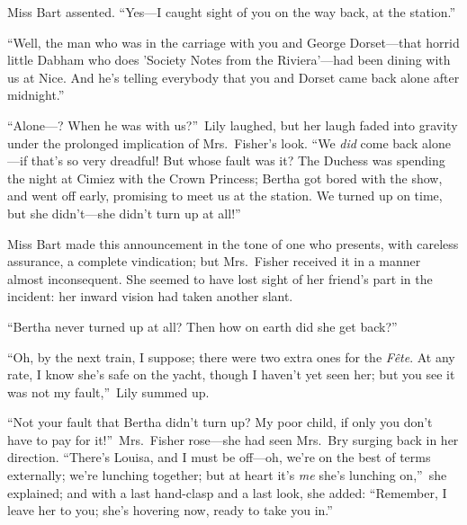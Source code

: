 \documentclass[12pt,a4paper]{book}
\begin{document}
Miss Bart assented. ``Yes---I caught sight of you on the way back,
at the station.''





``Well, the man who was in the carriage with you and George
Dorset---that horrid little Dabham who does 'Society Notes from
the Riviera'---had been dining with us at Nice. And he's telling
everybody that you and Dorset came back alone after midnight.''





``Alone---? When he was with us?''\ Lily laughed, but her laugh faded
into gravity under the prolonged implication of Mrs.\ Fisher's
look. ``We \textit{did} come back alone---if that's so very dreadful! But
whose fault was it? The Duchess was spending the night at Cimiez
with the Crown Princess; Bertha got bored with the show, and went
off early, promising to meet us at the station. We turned up on
time, but she didn't---she didn't turn up at all!''





Miss Bart made this announcement in the tone of one who presents,
with careless assurance, a complete vindication; but Mrs.\ Fisher
received it in a manner almost inconsequent. She seemed to have
lost sight of her friend's part in the incident: her inward
vision had taken another slant.





``Bertha never turned up at all? Then how on earth did she get
back?''





``Oh, by the next train, I suppose; there were two extra ones for
the \textit{F\^{e}te}. At any rate, I know she's safe on the yacht, though I
haven't yet seen her; but you see it was not my fault,''\ Lily
summed up.





``Not your fault that Bertha didn't turn up? My poor child, if
only you don't have to pay for it!''\ Mrs.\ Fisher rose---she had
seen Mrs.\ Bry surging back in her direction. ``There's Louisa, and
I must be off---oh, we're on the best of terms externally; we're
lunching together; but at heart it's \textit{me} she's lunching on,''\ she
explained; and with a last hand-clasp and a last look, she added: 
``Remember, I leave her to you; she's hovering now, ready to take
you in.''
\end{document}
